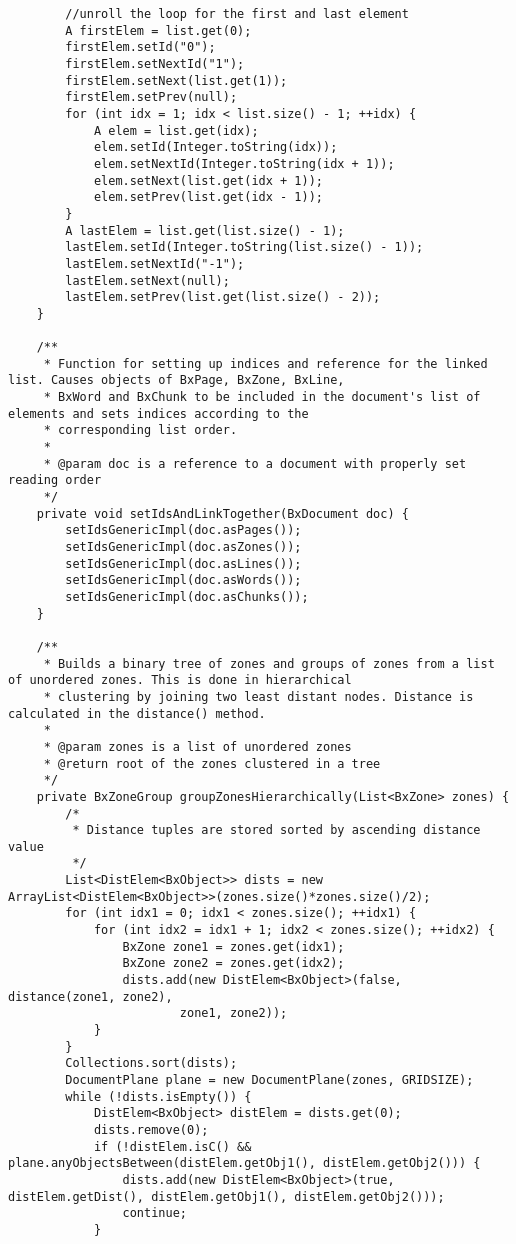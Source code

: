 \begin{appendices}
\begin{lstlisting}
        //unroll the loop for the first and last element
        A firstElem = list.get(0);
        firstElem.setId("0");
        firstElem.setNextId("1");
        firstElem.setNext(list.get(1));
        firstElem.setPrev(null);
        for (int idx = 1; idx < list.size() - 1; ++idx) {
            A elem = list.get(idx);
            elem.setId(Integer.toString(idx));
            elem.setNextId(Integer.toString(idx + 1));
            elem.setNext(list.get(idx + 1));
            elem.setPrev(list.get(idx - 1));
        }
        A lastElem = list.get(list.size() - 1);
        lastElem.setId(Integer.toString(list.size() - 1));
        lastElem.setNextId("-1");
        lastElem.setNext(null);
        lastElem.setPrev(list.get(list.size() - 2));
    }

    /**
     * Function for setting up indices and reference for the linked list. Causes objects of BxPage, BxZone, BxLine,
     * BxWord and BxChunk to be included in the document's list of elements and sets indices according to the
     * corresponding list order.
     *
     * @param doc is a reference to a document with properly set reading order
     */
    private void setIdsAndLinkTogether(BxDocument doc) {
        setIdsGenericImpl(doc.asPages());
        setIdsGenericImpl(doc.asZones());
        setIdsGenericImpl(doc.asLines());
        setIdsGenericImpl(doc.asWords());
        setIdsGenericImpl(doc.asChunks());
    }

    /**
     * Builds a binary tree of zones and groups of zones from a list of unordered zones. This is done in hierarchical
     * clustering by joining two least distant nodes. Distance is calculated in the distance() method.
     *
     * @param zones is a list of unordered zones
     * @return root of the zones clustered in a tree
     */
    private BxZoneGroup groupZonesHierarchically(List<BxZone> zones) {
        /*
         * Distance tuples are stored sorted by ascending distance value
         */
        List<DistElem<BxObject>> dists = new ArrayList<DistElem<BxObject>>(zones.size()*zones.size()/2);
        for (int idx1 = 0; idx1 < zones.size(); ++idx1) {
            for (int idx2 = idx1 + 1; idx2 < zones.size(); ++idx2) {
                BxZone zone1 = zones.get(idx1);
                BxZone zone2 = zones.get(idx2);
                dists.add(new DistElem<BxObject>(false, distance(zone1, zone2),
                        zone1, zone2));
            }
        }
        Collections.sort(dists);
        DocumentPlane plane = new DocumentPlane(zones, GRIDSIZE);
        while (!dists.isEmpty()) {
            DistElem<BxObject> distElem = dists.get(0);
            dists.remove(0);
            if (!distElem.isC() && plane.anyObjectsBetween(distElem.getObj1(), distElem.getObj2())) {
                dists.add(new DistElem<BxObject>(true, distElem.getDist(), distElem.getObj1(), distElem.getObj2()));
                continue;
            }


\end{lstlisting}
\end{appendices}
